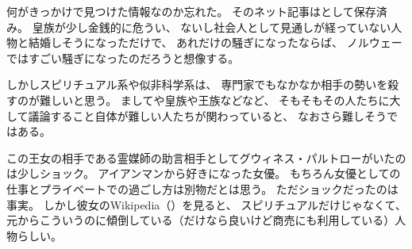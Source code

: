 \documentclass[C:/souji/all-note/note]{subfiles}
\begin{document}
何がきっかけで見つけた情報なのか忘れた。
そのネット記事は\cite{Except007}として保存済み。
皇族が少し金銭的に危うい、
ないし社会人として見通しが経っていない人物と結婚しそうになっただけで、
あれだけの騒ぎになったならば、
ノルウェーではすごい騒ぎになったのだろうと想像する。

しかしスピリチュアル系や似非科学系は、
専門家でもなかなか相手の勢いを殺すのが難しいと思う。
ましてや皇族や王族などなど、
そもそもその人たちに大して議論すること自体が難しい人たちが関わっていると、
なおさら難しそうではある。

この王女の相手である霊媒師の助言相手としてグウィネス・パルトローがいたのは少しショック。
アイアンマンから好きになった女優。
もちろん女優としての仕事とプライベートでの過ごし方は別物だとは思う。
ただショックだったのは事実。
しかし彼女のWikipedia（\cite{Wiki012}）を見ると、
スピリチュアルだけじゃなくて、
元からこういうのに傾倒している（だけなら良いけど商売にも利用している）人物らしい。
\end{document}
